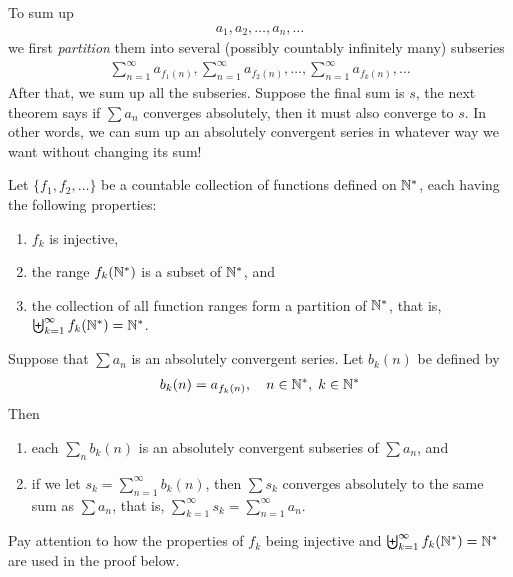 \documentclass[thmcnt=section, 12pt]{my-elegantbook}
\begin{document}

To sum up
\begin{align*}
    a_1, a_2, \ldots, a_n, \ldots
\end{align*}
we first \textit{partition} them into several (possibly countably infinitely many) subseries
\begin{align*}
    \sum_{n=1}^\infty a_{f_1(n)}, \sum_{n=1}^\infty a_{f_2(n)}, \ldots,
    \sum_{n=1}^\infty a_{f_k(n)}, \ldots
\end{align*}
After that, we sum up all the subseries. Suppose the final sum is $s$, the next theorem says if $\sum a_n$ converges absolutely, then it must also converge to $s$. In other words, we can sum up an absolutely convergent series in whatever way we want without changing its sum!

\begin{theorem} \label{thm:50}
    Let $\{f_1, f_2, \ldots\}$ be a countable collection of functions defined on $\mathbb{N}^\ast$, each having the following properties:
    \begin{enumerate}
        \item $f_k$ is injective,
        \item the range $f_k(\mathbb{N}^\ast)$ is a subset of $\mathbb{N}^\ast$, and
        \item the collection of all function ranges form a partition of $\mathbb{N}^\ast$, that is, $\biguplus_{k=1}^\infty f_k(\mathbb{N}^\ast) = \mathbb{N}^\ast$.
    \end{enumerate}
    Suppose that $\sum a_n$ is an absolutely convergent series. Let $b_k(n)$ be defined by
    \begin{align*}
        b_k(n) = a_{f_k(n)},
        \quad
        n \in \mathbb{N}^\ast, \;
        k \in \mathbb{N}^\ast
    \end{align*}
    Then
    \begin{enumerate}
        \item each $\sum_n b_k(n)$ is an absolutely convergent subseries of $\sum a_n$, and
        \item if we let $s_k = \sum_{n=1}^\infty b_k(n)$, then $\sum s_k$ converges absolutely to the same sum as $\sum a_n$, that is, $\sum_{k=1}^\infty s_k = \sum_{n=1}^\infty a_n$.
    \end{enumerate}
\end{theorem}

\begin{note}
    Pay attention to how the properties of $f_k$ being injective and $\biguplus_{k=1}^\infty f_k(\mathbb{N}^\ast)= \mathbb{N}^\ast$ are used in the proof below.
\end{note}
\end{document}
